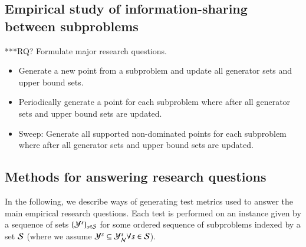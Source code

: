 \subsection{Empirical study of information-sharing between subproblems}
***RQ? Formulate major research questions.

\begin{itemize}
	\item 
Generate a new point from a subproblem and update all generator sets and upper bound sets.
	\item 
Periodically generate a point for each subproblem where after all generator sets and upper bound sets are updated.
	\item 
Sweep: Generate all supported non-dominated points for each subproblem where after all generator sets and upper bound sets are updated.
\end{itemize}



\subsection{Methods for answering research questions}

In the following, we describe ways of generating test metrics used to answer the main empirical research questions. Each test is performed on an \msp instance given by a sequence of sets $\{\Y^s\}_{s \in \S}$ for some ordered sequence of subproblems indexed by a set $\S$ (where we assume $\Y^s \subseteq \Yn^s \forall s \in \S$).

